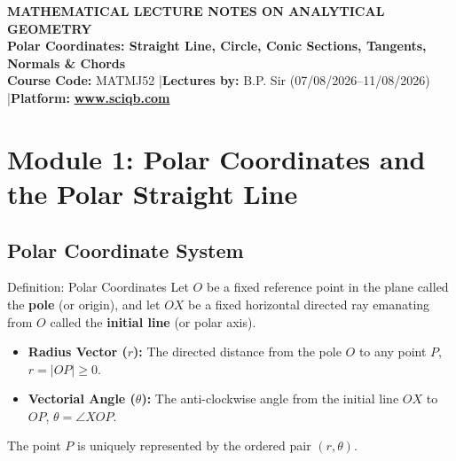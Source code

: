 \documentclass[11pt,a4paper]{article}
\begin{document}
\begin{center}
    \begin{tcolorbox}[sharp corners, boxrule=1.5pt]
        \begin{center}
            {\Large \bfseries \color{primarynavy} MATHEMATICAL LECTURE NOTES ON ANALYTICAL GEOMETRY}\\[4pt]
            {\large \bfseries \color{secondaryteal} Polar Coordinates: Straight Line, Circle, Conic Sections, Tangents, Normals \& Chords}\\[6pt]
            {\small \textbf{Course Code:} MATMJ52 \quad|\quad \textbf{Lectures by:} B.P. Sir (07/08/2026--11/08/2026) \quad|\quad \textbf{Platform:} \href{https://www.sciqb.com}{\color{accentblue}\textbf{www.sciqb.com}}}
        \end{center}
    \end{tcolorbox}
\end{center}

\vspace{0.2cm}

\tableofcontents
\newpage

\section{Module 1: Polar Coordinates and the Polar Straight Line}

\subsection{Polar Coordinate System}

\begin{defbox}{Definition: Polar Coordinates}
Let $O$ be a fixed reference point in the plane called the \textbf{pole} (or origin), and let $OX$ be a fixed horizontal directed ray emanating from $O$ called the \textbf{initial line} (or polar axis).
\begin{itemize}
    \item \textbf{Radius Vector ($r$):} The directed distance from the pole $O$ to any point $P$, $r = |OP| \ge 0$.
    \item \textbf{Vectorial Angle ($\theta$):} The anti-clockwise angle from the initial line $OX$ to $OP$, $\theta = \angle XOP$.
\end{itemize}
The point $P$ is uniquely represented by the ordered pair $(r, \theta)$.
\end{defbox}
\end{document}
